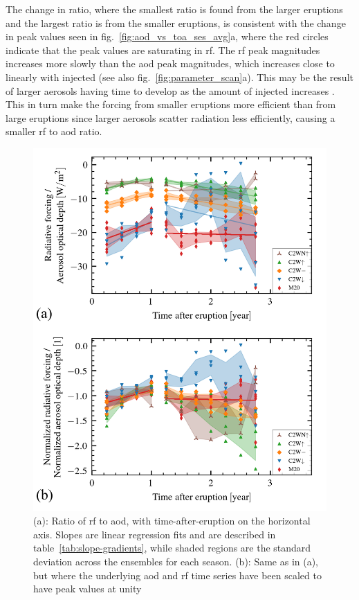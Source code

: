 \documentclass{ametsocV6.1}
\begin{document}
The change in ratio, where the smallest ratio is found from the larger eruptions and the
largest ratio is from the smaller eruptions, is consistent with the change in peak
values seen in fig.~\ref{fig:aod_vs_toa_ses_avg}a, where the red circles indicate that
the peak values are saturating in \gls{rf}. The \gls{rf} peak magnitudes increases more
slowly than the \gls{aod} peak magnitudes, which increases close to linearly with
injected  (see also fig.~\ref{fig:parameter_scan}a). This may be the result of
larger aerosols having time to develop as the amount of injected  increases
\citep{niemeier2015,marshall2019}. This in turn make the forcing from smaller eruptions
more efficient than from large eruptions since larger aerosols scatter radiation less
efficiently, causing a smaller \gls{rf} to \gls{aod} ratio.

\begin{figure}
  \centering
  \includegraphics[width=0.95\linewidth]{figures/figure4.png}

  \caption{(a): Ratio of \gls{rf} to \gls{aod}, with time-after-eruption on the horizontal
    axis. Slopes are linear regression fits and are described in
    table~\ref{tab:slope-gradients}, while shaded regions are the standard deviation across
    the ensembles for each season. (b): Same as in (a), but where the underlying \gls{aod}
    and \gls{rf} time series have been scaled to have peak values at
    unity}\label{fig:aod_vs_toa_avg_loop_ratios}%
\end{figure}
\end{document}
